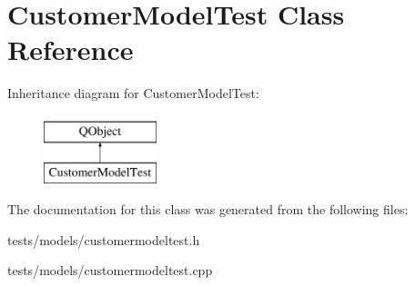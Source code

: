 \hypertarget{classCustomerModelTest}{\section{Customer\+Model\+Test Class Reference}
\label{classCustomerModelTest}
}
Inheritance diagram for Customer\+Model\+Test\+:\begin{figure}[H]
\begin{center}
\leavevmode
\includegraphics[height=2.000000cm]{d5/dcd/classCustomerModelTest}
\end{center}
\end{figure}


The documentation for this class was generated from the following files\+:\begin{DoxyCompactItemize}
\item 
tests/models/customermodeltest.\+h\item 
tests/models/customermodeltest.\+cpp\end{DoxyCompactItemize}

